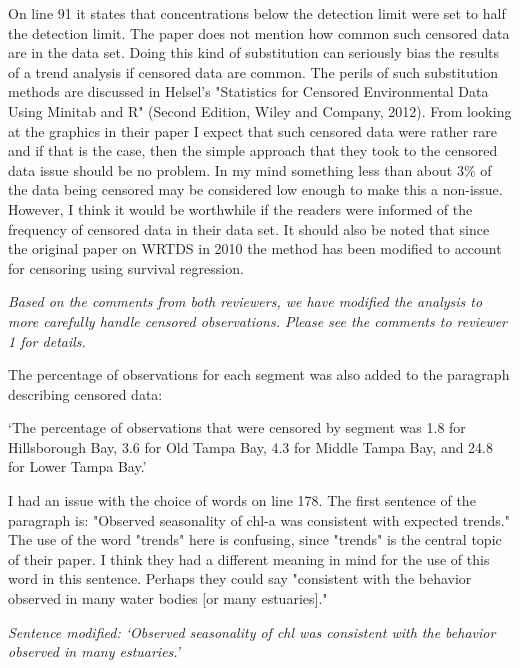 \documentclass[letterpaper,12pt,oneside]{article}\usepackage[]{graphicx}\usepackage[]{color}
\begin{document}
On line 91 it states that concentrations below the detection limit were set to half the detection limit.  The paper does not mention how common such censored data are in the data set.  Doing this kind of substitution can seriously bias the results of a trend analysis if censored data are common.  The perils of such substitution methods are discussed in Helsel's "Statistics for Censored Environmental Data Using Minitab and R" (Second Edition, Wiley and Company, 2012).  From looking at the graphics in their paper I expect that such censored data were rather rare and if that is the case, then the simple approach that they took to the censored data issue should be no problem.  In my mind something less than about 3\% of the data being censored may be considered low enough to make this a non-issue.  However, I think it would be worthwhile if the readers were informed of the frequency of censored data in their data set.  It should also be noted that since the original paper on WRTDS in 2010 the method has been modified to account for censoring using survival regression.  

{\it Based on the comments from both reviewers, we have modified the analysis to more carefully handle censored observations.  Please see the comments to reviewer 1 for details.  

The percentage of observations for each segment was also added to the paragraph describing censored data:

`The percentage of observations that were censored by segment was 1.8 for Hillsborough Bay, 3.6 for Old Tampa Bay, 4.3 for Middle Tampa Bay, and 24.8 for Lower Tampa Bay.'}

I had an issue with the choice of words on line 178.  The first sentence of the paragraph is: "Observed seasonality of chl-a was consistent with expected trends."  The use of the word "trends" here is confusing, since "trends" is the central topic of their paper.  I think they had a different meaning in mind for the use of this word in this sentence.  Perhaps they could say "consistent with the behavior observed in many water bodies [or many estuaries]."  

{\it Sentence modified: `Observed seasonality of \acs{chl} was consistent with the behavior observed in many estuaries.'}
\end{document}

